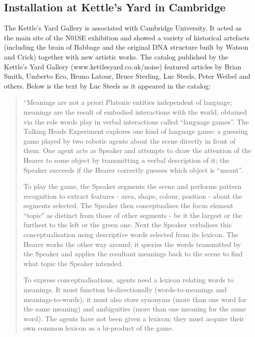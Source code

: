 \subsection{Installation at Kettle's Yard in Cambridge} 

The Kettle's Yard Gallery is associated with Cambridge University. It acted as the main site of the N01SE exhibition 
and showed a variety of historical artefacts (including the brain of Babbage and the original DNA structure built by 
Watson and Crick) together with new artistic works. The catalog published by the Kettle's Yard 
Gallery (www.kettlesyard.co.uk/noise) featured articles by Brian Smith, Umberto Eco, Bruno Latour, 
Bruce Sterling, Luc Steels, Peter Weibel and others. Below is the text by Luc Steels as it appeared in the catalog: 
\begin{quotation}
``Meanings are not a priori Platonic entities independent of language; meanings are the result of embodied interactions with the world, obtained via the role words play in verbal interactions called ``language games''. The Talking Heads Experiment explores one kind of language game: a guessing game played by two robotic agents about the scene directly in front of them. One agent acts as Speaker and attempts to draw the attention of the Hearer to some object by transmitting a verbal description of it; the Speaker succeeds if the Hearer correctly guesses which object is ``meant''.

To play the game, the Speaker segments the scene and performs pattern recognition to extract features - area, shape, colour, position - about the segments selected. The Speaker then conceptualises the focus element ``topic" as distinct from those of other segments - be it the largest or the furthest to the left or the green one. Next the Speaker verbalises this conceptualisation using descriptive words selected from its lexicon. The Hearer works the other way around; it queries the words transmitted by the Speaker and applies the resultant meanings back to the scene to find what topic the Speaker intended.

To express conceptualisations, agents need a lexicon relating words to meanings. It must function bi-directionally (words-to-meanings and meanings-to-words); it must also store synonyms (more than one word for the same meaning) and ambiguities (more than one meaning for the same word). The agents have not been given a lexicon; they must acquire their own common lexicon as a bi-product of the game.


\end{quotation}
